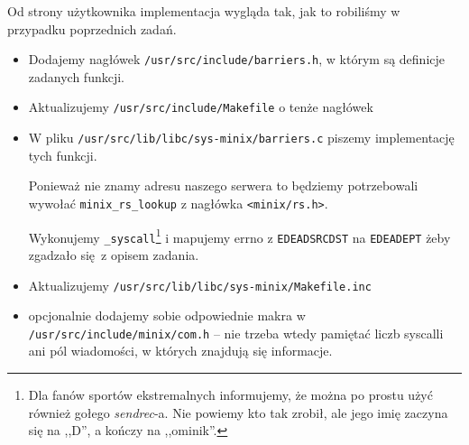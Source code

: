 Od strony użytkownika implementacja wygląda tak, jak to robiliśmy w przypadku poprzednich zadań.
\begin{itemize}
    \item Dodajemy nagłówek \texttt{/usr/src/include/barriers.h}, w którym są definicje zadanych funkcji.
    \item Aktualizujemy \texttt{/usr/src/include/Makefile} o tenże nagłówek
    \item W pliku \texttt{/usr/src/lib/libc/sys-minix/barriers.c} piszemy implementację tych funkcji.
        
        Ponieważ nie znamy adresu naszego serwera to będziemy potrzebowali wywołać \texttt{minix\_rs\_lookup} z nagłówka \texttt{<minix/rs.h>}.
        
        Wykonujemy \texttt{\_syscall}\footnote{Dla fanów sportów ekstremalnych informujemy, że można po prostu użyć również gołego \textit{sendrec}-a. Nie powiemy kto tak zrobił, ale jego imię zaczyna się na ,,D'', a kończy na ,,ominik''. } i mapujemy errno z \texttt{EDEADSRCDST} na \texttt{EDEADEPT} żeby zgadzało się z opisem zadania.
    \item Aktualizujemy \texttt{/usr/src/lib/libc/sys-minix/Makefile.inc}
    \item opcjonalnie dodajemy sobie odpowiednie makra w \texttt{/usr/src/include/minix/com.h} -- nie trzeba wtedy pamiętać liczb syscalli ani pól wiadomości, w których znajdują się informacje.
\end{itemize}


